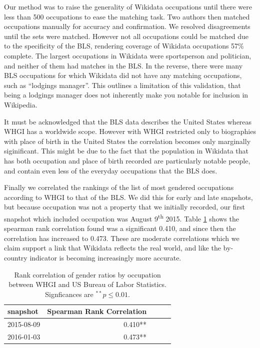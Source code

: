 \documentclass{sig-alternate-05-2015}
\begin{document}
Our method was to raise the generality of Wikidata occupations until there were less than 500 occupations to ease the matching task. Two authors then matched occupations manually for accuracy and confirmation. We resolved disagreements until the sets were matched. However not all occupations could be matched due to the specificity of the BLS, rendering coverage of Wikidata occupations 57\% complete. The largest occupations in Wikidata were sportsperson and politician, and neither of them had matches in the BLS. In the reverse, there were many BLS occupations for which Wikidata did not have any matching occupations, such as ``lodgings manager''. This outlines a limitation of this validation, that being a lodgings manager does not inherently make you notable for inclusion in Wikipedia. 

It must be acknowledged that the BLS data describes the United States whereas WHGI has a worldwide scope. However with WHGI restricted only to biographies with place of birth in the United States the correlation becomes only marginally siginificant. This might be due to the fact that the population in Wikidata that has both occupation and place of birth recorded are particularly notable people, and contain even less of the everyday occupations that the BLS does.

Finally we correlated the rankings of the list of most gendered occupations according to WHGI to that of the BLS. We did this for early and late snapshots, but because occupation was not a property that we initially recorded, our first snapshot which included occupation was August 9\textsuperscript{th} 2015.  Table \ref{table:bls} shows the spearman rank correlation found was a significant 0.410, and since then the correlation has increased to 0.473. These are moderate correlations which we claim support a link that Wikidata reflects the real world, and like the by-country indicator is becoming increasingly more accurate.

\begin{table}
\caption{Rank correlation of gender ratios by occupation between WHGI and US
Bureau of Labor Statistics. Signficances are $ ^{**}p\leq 0.01$.}
\begin{tabular}{lrrrr}
\toprule
snapshot &  Spearman Rank Correlation \\
\midrule
2015-08-09 & 0.410**  \\
2016-01-03 & 0.473**  \\
\bottomrule
\end{tabular}
\label{table:bls}
\end{table}
\end{document}
